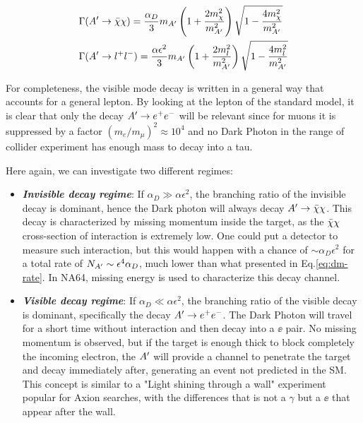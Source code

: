 \begin{equation}
  \label{eq:dm-bratio}
  \begin{aligned}
    &\Gamma(A' \to \bar{\chi} \chi) = \frac{\alpha_D}{3} m_{A'} \left( 1 + \frac{2m^2_{\chi}}{m_{A'}^2}\right) \sqrt{1 - \frac{4m_{\chi}^2}{m^2_{A'}}}\\
    &\Gamma(A' \to l^+l^-) = \frac{\alpha \epsilon^2}{3} m_{A'} \left( 1 + \frac{2m^2_{l}}{m_{A'}^2}\right) \sqrt{1 - \frac{4m_{l}^2}{m^2_{A'}}}
  \end{aligned}
\end{equation}

For completeness, the visible mode decay is written in a general way that accounts for a general lepton. By looking at the lepton of the standard model, it is clear that only the decay $A' \to e^+e^-$ will be relevant since for muons it is suppressed by a factor $(m_e/m_{\mu})^2 \approx 10^4$ and no Dark Photon in the range of collider experiment has enough mass to decay into a tau.

Here again, we can investigate two different regimes:
\begin{itemize}
\item \textbf{\textit{Invisible decay regime}}: If $\alpha_D \gg \alpha \epsilon^2$, the branching ratio of the invisible decay is dominant, hence the Dark photon will always decay $A' \to \bar{\chi} \chi$. This decay is characterized by missing momentum inside the target, as the $\bar{\chi} \chi$ cross-section of interaction is extremely low. One could put a detector to measure such interaction, but this would happen with a chance of $\sim \alpha_D \epsilon^2$ for a total rate of $N_{A'} \sim \epsilon^4 \alpha_D$, much lower than what presented in Eq.\ref{eq:dm-rate}. In NA64, missing energy is used to characterize this decay channel. 
\item \textbf{\textit{Visible decay regime}}: If $\alpha_D \ll \alpha \epsilon^2$, the branching ratio of the visible decay is dominant, specifically the decay $A' \to e^+e^-$. The Dark Photon will travel for a short time without interaction and then decay into a $\ee$ pair. No missing momentum is observed, but if the target is enough thick to block completely the incoming electron, the $A'$ will provide a channel to penetrate the target and decay immediately after, generating an event not predicted in the SM. This concept is similar to a "Light shining through a wall" experiment popular for Axion searches, with the differences that is not a $\gamma$ but a $\ee$ that appear after the wall.
\end{itemize}


